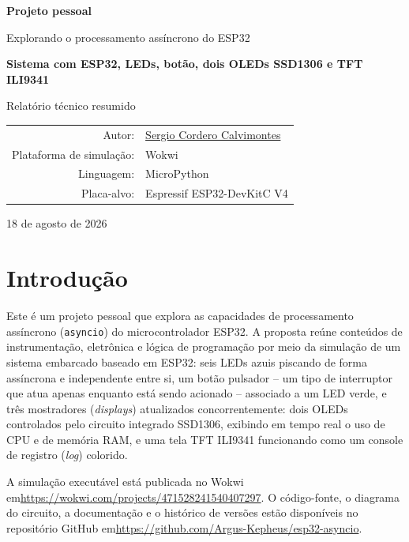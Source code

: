 \documentclass[12pt,a4paper]{article}
\newcommand{\ProjectTitle}{Sistema com ESP32, LEDs, botão, dois OLEDs SSD1306 e TFT ILI9341}
\newcommand{\AuthorWebsite}{https://argus-kepheus.github.io/sergio-cordero-calvimontes/\#home}
\newcommand{\AuthorName}{\href{\AuthorWebsite}{Sergio Cordero Calvimontes}}
\newcommand{\WokwiURL}{https://wokwi.com/projects/471528241540407297}
\newcommand{\GitHubURL}{https://github.com/Argus-Kepheus/esp32-asyncio}
\newcommand{\RevisionDate}{18 de agosto de 2026}
\begin{document}
\begin{titlepage}
  \centering
  \vspace*{1.5cm}

  {\Large \textbf{Projeto pessoal}\par}
  \vspace{0.7cm}
  {\large Explorando o processamento assíncrono do ESP32\par}

  \vfill

  {\huge\bfseries \ProjectTitle\par}
  \vspace{0.8cm}
  {\Large Relatório técnico resumido\par}

  \vfill

  \begin{tabular}{rl}
    Autor: & \AuthorName \\
    Plataforma de simulação: & Wokwi \\
    Linguagem: & MicroPython \\
    Placa-alvo: & Espressif ESP32-DevKitC V4 \\
  \end{tabular}

  \vfill

  {\large \RevisionDate\par}
\end{titlepage}

\tableofcontents
\newpage

\section{Introdução}

Este é um projeto pessoal que explora as capacidades de processamento assíncrono (\texttt{asyncio}) do microcontrolador ESP32. A proposta reúne conteúdos de instrumentação, eletrônica e lógica de programação por meio da simulação de um sistema embarcado baseado em ESP32: seis LEDs azuis piscando de forma assíncrona e independente entre si, um botão pulsador -- um tipo de interruptor que atua apenas enquanto está sendo acionado -- associado a um LED verde, e três mostradores (\textit{displays}) atualizados concorrentemente: dois OLEDs controlados pelo circuito integrado SSD1306, exibindo em tempo real o uso de CPU e de memória RAM, e uma tela TFT ILI9341 funcionando como um console de registro (\textit{log}) colorido.

A simulação executável está publicada no Wokwi em\linebreak[2]
\url{\WokwiURL}. O código-fonte, o diagrama do circuito, a documentação e o histórico de versões estão disponíveis no repositório GitHub em\linebreak[2]
\url{\GitHubURL}.
\end{document}
